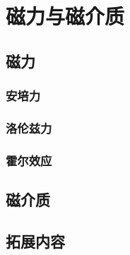 \chapter{磁力与磁介质}
\setcounter{example_counter}{1}

\section{磁力}

\subsection{安培力}

\subsection{洛伦兹力}

\subsection{霍尔效应}

\section{磁介质}

\section{拓展内容}